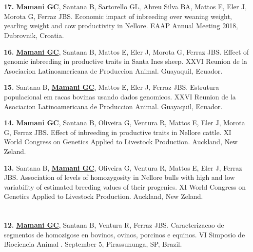 \documentclass[margin,line,10pt]{res}
\newenvironment{list1}{
  \begin{list}{\ding{113}}{%
      \setlength{\itemsep}{0in}
      \setlength{\parsep}{0in} \setlength{\parskip}{0in}
      \setlength{\topsep}{0in} \setlength{\partopsep}{0in} 
      \setlength{\leftmargin}{0.17in}}}{\end{list}}
\begin{document}
\begin{resume}
\section{}
\begin{list1}

\item [\bf{17}.] {\bf \underline{Mamani GC}}, Santana B, Sartorello GL, Abreu Silva BA, Mattos E, Eler J, Morota G, Ferraz JBS. Economic impact of inbreeding over weaning weight, yearling weight and cow productivity in Nellore.
EAAP Annual Meeting 2018, Dubrovnik, Croatia. 
\vspace{0.5cm}

\item [\bf{16}.] {\bf \underline{Mamani GC}}, Santana B, Mattos E, Eler J, Morota G, Ferraz JBS. Effect of genomic inbreeding in productive traits in Santa Ines sheep.
XXVI Reunion de la Asociacion Latinoamericana de Produccion Animal. Guayaquil, Ecuador. 
\vspace{0.5cm}

\item [\bf{15}.] Santana B, {\bf \underline{Mamani GC}}, Mattos E, Eler J, Ferraz JBS. 
Estrutura populacional em racas bovinas usando dados genomicos. 
XXVI Reunion de la Asociacion Latinoamericana de Produccion Animal. Guayaquil, Ecuador. 
\vspace{0.5cm}

\item [\bf{14}.] {\bf \underline{Mamani GC}}, Santana B, Oliveira G, Ventura R, Mattos E, Eler J, Morota G, Ferraz JBS. 
Effect of inbreeding in productive traits in Nellore cattle.
XI World Congress on Genetics Applied to Livestock Production. Auckland, New Zeland. 
\vspace{0.5cm}

\item [\bf{13}.] Santana B, {\bf \underline{Mamani GC}}, Oliveira G, Ventura R, Mattos E, Eler J, Ferraz JBS. 
Association of levels of homozygosity in Nellore bulls with high and low variability of estimated breeding values of their progenies.
XI World Congress on Genetics Applied to Livestock Production. Auckland, New Zeland. 
\end{list1}

\section{}
\begin{list1}
\item [\bf{12}.] {\bf \underline{Mamani GC}}, Santana B,  Ventura R, Ferraz JBS. 
Caracterizacao de segmentos de homozigose en bovinos, ovinos, porcinos e equinos.
VI Simposio de Biociencia Animal . September 5, Pirassununga, SP, Brazil. 
\vspace{0.5cm}


\end{list1}
\end{resume}
\end{document}
